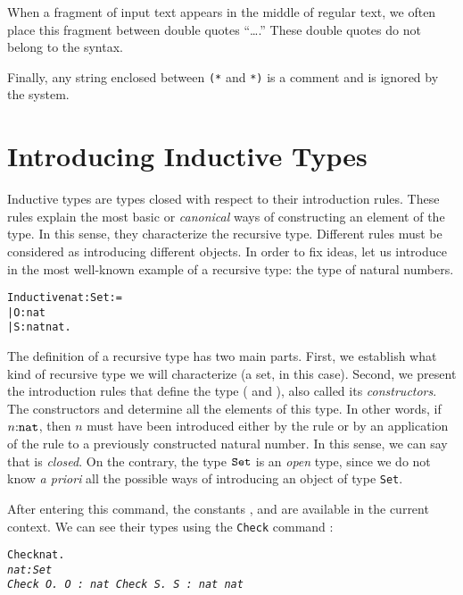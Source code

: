 \documentclass[11pt]{article}
\newcommand{\refmancite}[1]{{}}
\begin{document}
When a fragment of \coq{} input text appears in the middle of
regular text, we often place this fragment between double quotes
``\dots.''  These double quotes do not belong to the \coq{} syntax.

Finally, any
string enclosed between \texttt{(*} and \texttt{*)} is a comment and
is ignored by the \coq{} system.

\section{Introducing Inductive Types} 
\label{Introduction}

Inductive types are types closed with respect to their introduction
rules. These rules explain the most basic or \textsl{canonical} ways
of constructing an element of the type.  In this sense, they
characterize the recursive type. Different rules must be considered as
introducing different objects. In order to fix ideas, let us introduce
in {\coq} the most well-known example of a recursive type: the type of
natural numbers.

\begin{alltt}
Inductive nat : Set := 
 | O : nat 
 | S : nat\arrow{}nat.
\end{alltt}

The definition of a recursive type has two main parts. First, we
establish what kind of recursive type we will characterize (a set, in
this case). Second, we present the introduction rules that define the
type ({\Z} and {\SUCC}), also called its {\sl constructors}. The constructors
{\Z} and {\SUCC} determine all the elements of this type. In other
words, if $n\mbox{:}\texttt{nat}$, then $n$ must have been introduced either
by the rule {\Z} or by an application of the rule {\SUCC} to a
previously constructed natural number. In this sense, we can say
that {\nat} is \emph{closed}. On the contrary, the type
$\texttt{Set}$ is an {\it open} type, since we do not know {\it a priori} all
the possible ways of introducing an object of type \texttt{Set}.

After entering this command, the constants {\nat}, {\Z} and {\SUCC} are
available in the current context. We can see their types using the
\texttt{Check} command \refmancite{Section \ref{Check}}:

\begin{alltt}
Check nat.
\it{}nat : Set
\tt{}Check O.
\it{}O : nat
\tt{}Check S.
\it{}S : nat {\arrow} nat
\end{alltt}
\end{document}
